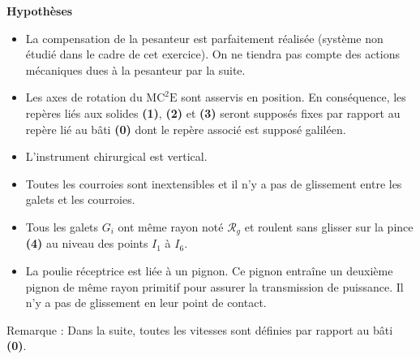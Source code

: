 \begin{multicols}{2}
\ifprof
\else
\textbf{Hypothèses}
\begin{itemize}
\item La compensation de la pesanteur est parfaitement réalisée (système non étudié dans le cadre de cet exercice). On ne tiendra pas compte des actions mécaniques dues à la pesanteur par la suite.
\item Les axes de rotation du $\text{MC}^2\text{E}$ sont asservis en position. En conséquence, les repères liés aux solides \textbf{(1)}, \textbf{(2)} et \textbf{(3)} seront supposés fixes par rapport au repère lié au bâti \textbf{(0)} dont le repère associé est supposé galiléen.
\item L’instrument chirurgical est vertical.
\item Toutes les courroies sont inextensibles et il n’y a pas de glissement entre les galets et les courroies.
\item Tous les galets $G_i$ ont même rayon noté $\mathcal{R}_g$ et roulent sans glisser sur la pince \textbf{(4)} au niveau des points $I_1$ à $I_6$.
\item La poulie réceptrice est liée à un pignon. Ce pignon entraîne un deuxième pignon de même rayon primitif pour assurer la transmission de puissance. Il n’y a pas de glissement en leur point de contact.
\end{itemize}

Remarque : Dans la suite, toutes les vitesses sont définies par rapport au bâti \textbf{(0)}.


\end{multicols}
